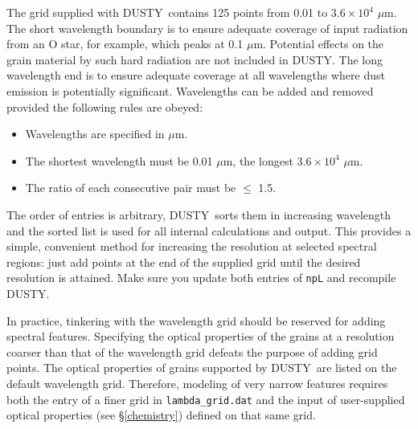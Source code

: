\documentclass[11pt]{article}
\def\D    {{\sf DUSTY}}
\def\mic    {\hbox{$\mu$m}}
\begin{document}
The grid supplied with \D\ contains 125 points from 0.01 to
$3.6\times10^{4}$ \mic.  The short wavelength boundary is to ensure
adequate coverage of input radiation from an O star, for example,
which peaks at 0.1 \mic.  Potential effects on the grain material by
such hard radiation are not included in \D.  The long wavelength end
is to ensure adequate coverage at all wavelengths where dust emission
is potentially significant. Wavelengths can be added and removed
provided the following rules are obeyed:
\begin{itemize}
\item Wavelengths are specified in \mic.
\item The shortest wavelength must be 0.01 \mic, the longest
  $3.6\times10^{4}$ \mic.
\item The ratio of each consecutive pair must be $\le$ 1.5.
\end{itemize}
The order of entries is arbitrary, \D\ sorts them in increasing
wavelength and the sorted list is used for all internal calculations
and output.  This provides a simple, convenient method for increasing
the resolution at selected spectral regions: just add points at the
end of the supplied grid until the desired resolution is attained.
Make sure you update both entries of {\tt npL} and recompile \D.

In practice, tinkering with the wavelength grid should be reserved for
adding spectral features. Specifying the optical properties of the
grains at a resolution coarser than that of the wavelength grid
defeats the purpose of adding grid points. The optical properties of
grains supported by \D\ are listed on the default wavelength grid.
Therefore, modeling of very narrow features requires both the entry of
a finer grid in {\tt lambda\_grid.dat} and the input of user-supplied
optical properties (see \S\ref{chemistry}) defined on that same grid.


\end{document}
